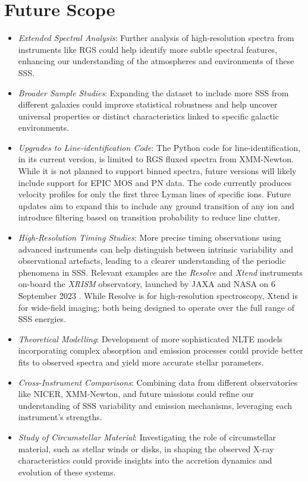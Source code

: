     \section{Future Scope}
    	\begin{itemize}
    		\item \textit{Extended Spectral Analysis}: Further analysis of high-resolution spectra from instruments like RGS could help identify more subtle spectral features, enhancing our understanding of the atmospheres and environments of these SSS.
    		
    		\item \textit{Broader Sample Studies}: Expanding the dataset to include more SSS from different galaxies could improve statistical robustness and help uncover universal properties or distinct characteristics linked to specific galactic environments.
    		
    		\item \textit{Upgrades to Line-identification Code}: The Python code for line-identification, in its current version, is limited to RGS fluxed spectra from XMM-Newton. While it is not planned to support binned spectra, future versions will likely include support for EPIC MOS and PN data. The code currently produces velocity profiles for only the first three Lyman lines of specific ions. Future updates aim to expand this to include any ground transition of any ion and introduce filtering based on transition probability to reduce line clutter.
    		
    		\item \textit{High-Resolution Timing Studies}: More precise timing observations using advanced instruments can help distinguish between intrinsic variability and observational artefacts, leading to a clearer understanding of the periodic phenomena in SSS. Relevant examples are the \textit{Resolve} and \textit{Xtend} instruments on-board the \textit{XRISM} observatory, launched by JAXA and NASA on 6 September 2023 \cite{tashiro2022xrism}. While Resolve is for high-resolution spectroscopy, Xtend is for wide-field imaging; both being designed to operate over the full range of SSS energies.
    		
    		\item \textit{Theoretical Modelling}: Development of more sophisticated NLTE models incorporating complex absorption and emission processes could provide better fits to observed spectra and yield more accurate stellar parameters.
    		
    		\item \textit{Cross-Instrument Comparisons}: Combining data from different observatories like NICER, XMM-Newton, and future missions could refine our understanding of SSS variability and emission mechanisms, leveraging each instrument's strengths.
    		
    		\item \textit{Study of Circumstellar Material}: Investigating the role of circumstellar material, such as stellar winds or disks, in shaping the observed X-ray characteristics could provide insights into the accretion dynamics and evolution of these systems.
    	\end{itemize}